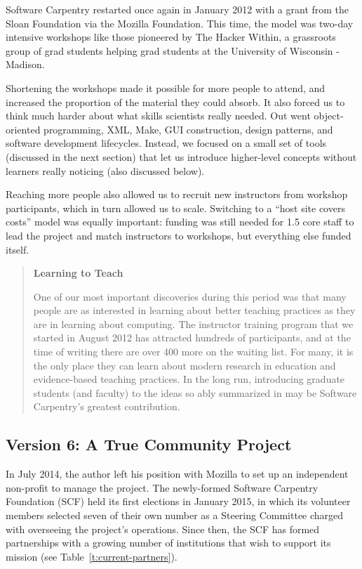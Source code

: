 \documentclass[10pt,a4paper,twocolumn]{article}
\begin{document}
Software Carpentry restarted once again in January 2012 with a grant
from the Sloan Foundation via the Mozilla Foundation.  This time, the
model was two-day intensive workshops like those pioneered by The
Hacker Within, a grassroots group of grad students helping grad
students at the University of Wisconsin - Madison.

Shortening the workshops made it possible for more people to attend,
and increased the proportion of the material they could absorb. It
also forced us to think much harder about what skills scientists
really needed. Out went object-oriented programming, XML, Make, GUI
construction, design patterns, and software development lifecycles.
Instead, we focused on a small set of tools (discussed in the next
section) that let us introduce higher-level concepts without learners
really noticing (also discussed below).

Reaching more people also allowed us to recruit new instructors from
workshop participants, which in turn allowed us to scale. Switching to
a ``host site covers costs'' model was equally important: funding was
still needed for 1.5 core staff to lead the project and match
instructors to workshops, but everything else funded itself.

\begin{quote}
\textbf{Learning to Teach}

One of our most important discoveries during this period was that many
people are as interested in learning about better teaching practices
as they are in learning about computing.  The instructor training
program that we started in August 2012 has attracted hundreds of
participants, and at the time of writing there are over 400 more on
the waiting list.  For many, it is the only place they can learn about
modern research in education and evidence-based teaching practices.
In the long run, introducing graduate students (and faculty) to the
ideas so ably summarized in \cite{hlw2010} may be Software Carpentry's
greatest contribution.

\end{quote}

\subsection*{Version 6: A True Community Project}

In July 2014, the author left his position with Mozilla to set up an
independent non-profit to manage the project.  The newly-formed
Software Carpentry Foundation (SCF) held its first elections in
January 2015, in which its volunteer members selected seven of their
own number as a Steering Committee charged with overseeing the
project's operations.  Since then, the SCF has formed partnerships
with a growing number of institutions that wish to support its mission
(see Table~\ref{t:current-partners}).
\end{document}
